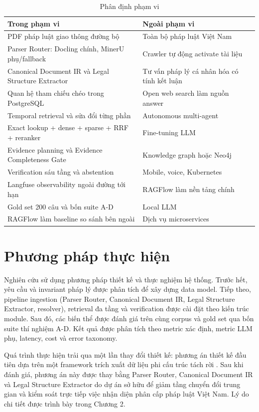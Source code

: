 \documentclass[a4paper,12pt]{extreport}
\begin{document}
\begin{table}[H]
\caption{Phân định phạm vi}
\begin{tabularx}{\textwidth}{X X}
\toprule
\textbf{Trong phạm vi} & \textbf{Ngoài phạm vi}\\
\midrule
PDF pháp luật giao thông đường bộ & Toàn bộ pháp luật Việt Nam\\
Parser Router: Docling chính, MinerU phụ/fallback & Crawler tự động activate tài liệu\\
Canonical Document IR và Legal Structure Extractor & Tư vấn pháp lý cá nhân hóa có tính kết luận\\
Quan hệ tham chiếu chéo trong PostgreSQL & Open web search làm nguồn answer\\
Temporal retrieval và sửa đổi từng phần & Autonomous multi-agent\\
Exact lookup + dense + sparse + RRF + reranker & Fine-tuning LLM\\
Evidence planning và Evidence Completeness Gate & Knowledge graph hoặc Neo4j\\
Verification sáu tầng và abstention & Mobile, voice, Kubernetes\\
Langfuse observability ngoài đường tới hạn & RAGFlow làm nền tảng chính\\
Gold set 200 câu và bốn suite A-D & Local LLM\\
RAGFlow làm baseline so sánh bên ngoài & Dịch vụ microservices\\
\bottomrule
\end{tabularx}
\end{table}

\section{Phương pháp thực hiện}

Nghiên cứu sử dụng phương pháp thiết kế và thực nghiệm hệ thống. Trước hết, yêu cầu và invariant pháp lý được phân tích để xây dựng data model. Tiếp theo, pipeline ingestion (Parser Router, Canonical Document IR, Legal Structure Extractor, resolver), retrieval đa tầng và verification được cài đặt theo kiến trúc module. Sau đó, các biến thể được đánh giá trên cùng corpus và gold set qua bốn suite thí nghiệm A-D. Kết quả được phân tích theo metric xác định, metric LLM phụ, latency, cost và error taxonomy.

Quá trình thực hiện trải qua một lần thay đổi thiết kế: phương án thiết kế đầu tiên dựa trên một framework trích xuất dữ liệu phi cấu trúc tách rời \cite{udef2026}. Sau khi đánh giá, phương án này được thay bằng Parser Router, Canonical Document IR và Legal Structure Extractor do dự án sở hữu để giảm tầng chuyển đổi trung gian và kiểm soát trực tiếp việc nhận diện phân cấp pháp luật Việt Nam. Lý do chi tiết được trình bày trong Chương 2.
\end{document}
